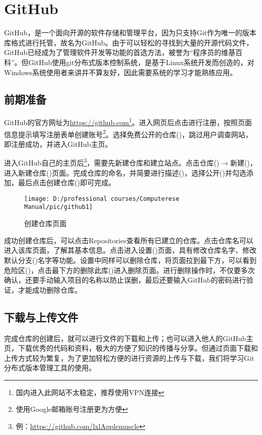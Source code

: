 \documentclass[cn, twoside]{myModel}
\begin{document}
	\maketitle
	\section{GitHub}
		\par{}GitHub，是一个面向开源的软件存储和管理平台，因为只支持Git作为唯一的版本库格式进行托管，故名为GitHub。由于可以轻松的寻找到大量的开源代码文件，GitHub已经成为了管理软件开发等功能的首选方法，被誉为“程序员的维基百科”。但GitHub使用git分布式版本控制系统，是基于Linux系统开发而创造的，对Windows系统使用者来讲并不算友好，因此需要系统的学习才能熟练应用。
		\subsection{前期准备}
			\par{}GitHub的官方网址为\url{https://github.com}\footnote{国内进入此网站不太稳定，推荐使用VPN连接}。进入网页后点击进行注册，按照页面信息提示填写注册表单创建账号\footnote{使用Google邮箱账号注册更为方便}。选择免费公开的仓库()，跳过用户调查网站，即注册成功，并进入GitHub主页。
			\par{}进入GitHub自己的主页后\footnote{例：\url{https://github.com/lxlApplemuscle}}，需要先新建仓库和建立站点。点击仓库()$\rightarrow$新建()，进入新建仓库()页面。完成仓库的命名，并简要进行描述()，选择公开()并勾选添加，最后点击创建仓库()即可完成。
			\begin{figure}[H]
				\centering
				\texttt{[image: D:/professional courses/Computerese Manual/pic/github1]}
				\caption{创建仓库页面}
				\label{pic1}
			\end{figure}
			\par{}成功创建仓库后，可以点击Repositories查看所有已建立的仓库。点击仓库名可以进入该库页面，了解其基本信息。点击进入设置()页面，具有修改仓库名字、修改默认分支()名字等功能。设置中同样可以删除仓库，将页面拉到最下方，可以看到危险区()，点击最下方的删除此库()进入删除页面。进行删除操作时，不仅要多次确认，还要手动输入项目的名称以防止误删，最后还要输入GitHub的密码进行验证，才能成功删除仓库。
		\subsection{下载与上传文件}
			\par{}完成仓库的创建后，就可以进行文件的下载和上传；也可以进入他人的GitHub主页，下载优秀的代码和资料，极大的方便了知识的传播与分享。但通过页面下载和上传方式较为繁复，为了更加轻松方便的进行资源的上传与下载，我们将学习Git分布式版本管理工具的使用。
\end{document}
